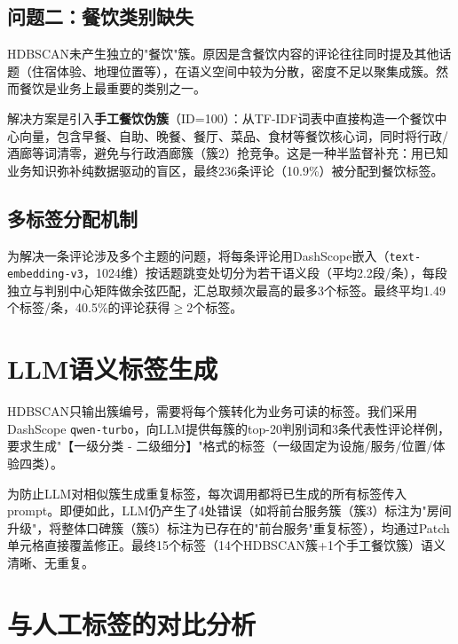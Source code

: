 \documentclass[11pt, a4paper]{article}
\begin{document}
\subsection{问题二：餐饮类别缺失}

HDBSCAN未产生独立的"餐饮"簇。原因是含餐饮内容的评论往往同时提及其他话题（住宿体验、地理位置等），在语义空间中较为分散，密度不足以聚集成簇。然而餐饮是业务上最重要的类别之一。

解决方案是引入\textbf{手工餐饮伪簇}（ID=100）：从TF-IDF词表中直接构造一个餐饮中心向量，包含早餐、自助、晚餐、餐厅、菜品、食材等餐饮核心词，同时将行政/酒廊等词清零，避免与行政酒廊簇（簇2）抢竞争。这是一种半监督补充：用已知业务知识弥补纯数据驱动的盲区，最终236条评论（10.9\%）被分配到餐饮标签。

\subsection{多标签分配机制}

为解决一条评论涉及多个主题的问题，将每条评论用DashScope嵌入（\texttt{text-embedding-v3}，1024维）按话题跳变处切分为若干语义段（平均2.2段/条），每段独立与判别中心矩阵做余弦匹配，汇总取频次最高的最多3个标签。最终平均1.49个标签/条，40.5\%的评论获得$\geq$2个标签。

\section{LLM语义标签生成}

HDBSCAN只输出簇编号，需要将每个簇转化为业务可读的标签。我们采用DashScope \texttt{qwen-turbo}，向LLM提供每簇的top-20判别词和3条代表性评论样例，要求生成"【一级分类 - 二级细分】"格式的标签（一级固定为设施/服务/位置/体验四类）。

为防止LLM对相似簇生成重复标签，每次调用都将已生成的所有标签传入prompt。即便如此，LLM仍产生了4处错误（如将前台服务簇（簇3）标注为"房间升级"，将整体口碑簇（簇5）标注为已存在的"前台服务"重复标签），均通过Patch单元格直接覆盖修正。最终15个标签（14个HDBSCAN簇+1个手工餐饮簇）语义清晰、无重复。

\section{与人工标签的对比分析}
\end{document}
